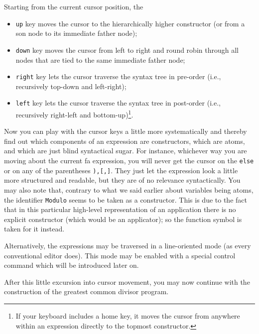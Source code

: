 Starting from the current cursor position, the
\begin{itemize}
\item {\tt up} key moves the cursor to the hierarchically higher constructor
(or from a {\mys son node} to its immediate {\mys father node});
\item {\tt down} key moves the cursor from left to right and round robin
through all nodes that are tied to the same immediate father node; 
\item {\tt right} key lets the cursor traverse the syntax tree in
 {\mys pre-order} (i.e., recursively top-down and left-right);
\item {\tt left} key lets the cursor traverse the syntax tree in {\mys post-order}
(i.e., recursively right-left and bottom-up)\footnote{If your keyboard includes a {\mys home key}, it moves the cursor from anywhere within an expression
directly to the topmost constructor.}.
\end{itemize}

Now you can play with the cursor keys a little more systematically and
thereby find out which components of an expression are constructors,
which are atoms, and which are just blind syntactical sugar. For instance,
whichever way you are moving about the current {\sc fa} expression, you will never
get the cursor on the {\tt else} or on any of the parentheses {\tt ),[,]}. They
just let the expression look a little more structured and readable,
 but they are
of no relevance syntactically.  You may also note that, contrary to what
we said earlier about variables being atoms, the identifier {\tt Modulo}
seems to be taken as  a constructor.
This is due to the fact that in this particular high-level representation of an 
application there is no explicit constructor (which would be an applicator); so the function symbol is taken for it instead.

Alternatively, the expressions may be traversed in a line-oriented mode (as every conventional
editor does). This mode may  be enabled with a special control command which will be introduced 
later on.
 
After this
little excursion into cursor movement, you may now
 continue with the construction of the greatest common divisor
program. 

